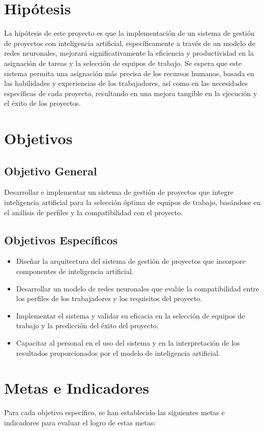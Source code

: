 \documentclass{article}
\begin{document}
\section{Hipótesis}
La hipótesis de este proyecto es que la implementación de un sistema de gestión de proyectos con inteligencia artificial, específicamente a través de un modelo de redes neuronales, mejorará significativamente la eficiencia y productividad en la asignación de tareas y la selección de equipos de trabajo. Se espera que este sistema permita una asignación más precisa de los recursos humanos, basada en las habilidades y experiencias de los trabajadores, así como en las necesidades específicas de cada proyecto, resultando en una mejora tangible en la ejecución y el éxito de los proyectos.

\section{Objetivos}
    \subsection{Objetivo General}
    Desarrollar e implementar un sistema de gestión de proyectos que integre inteligencia artificial para la selección óptima de equipos de trabajo, basándose en el análisis de perfiles y la compatibilidad con el proyecto.

    \subsection{Objetivos Específicos}
    \begin{itemize}
        \item Diseñar la arquitectura del sistema de gestión de proyectos que incorpore componentes de inteligencia artificial.
        \item Desarrollar un modelo de redes neuronales que evalúe la compatibilidad entre los perfiles de los trabajadores y los requisitos del proyecto.
        \item Implementar el sistema y validar su eficacia en la selección de equipos de trabajo y la predicción del éxito del proyecto.
        \item Capacitar al personal en el uso del sistema y en la interpretación de los resultados proporcionados por el modelo de inteligencia artificial.
    \end{itemize}


    \section{Metas e Indicadores}
    Para cada objetivo específico, se han establecido las siguientes metas e indicadores para evaluar el logro de estas metas:
\end{document}
